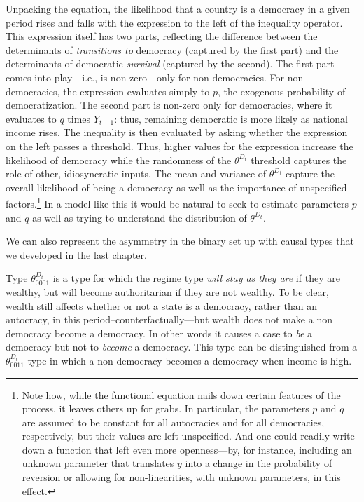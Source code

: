 \documentclass[
  12pt,
]{book}
\begin{document}
Unpacking the equation, the likelihood that a country is a democracy in a given period rises and falls with the expression to the left of the inequality operator. This expression itself has two parts, reflecting the difference between the determinants of \emph{transitions to} democracy (captured by the first part) and the determinants of democratic \emph{survival} (captured by the second). The first part comes into play---i.e., is non-zero---only for non-democracies. For non-democracies, the expression evaluates simply to \(p\), the exogenous probability of democratization. The second part is non-zero only for democracies, where it evaluates to \(q\) times \(Y_{t-1}\): thus, remaining democratic is more likely as national income rises. The inequality is then evaluated by asking whether the expression on the left passes a threshold. Thus, higher values for the expression increase the likelihood of democracy while the randomness of the \(\theta^{D_t}\) threshold captures the role of other, idiosyncratic inputs. The mean and variance of \(\theta^{D_t}\) capture the overall likelihood of being a democracy as well as the importance of unspecified factors.\footnote{Note how, while the functional equation nails down certain features of the process, it leaves others up for grabs. In particular, the parameters \(p\) and \(q\) are assumed to be constant for all autocracies and for all democracies, respectively, but their values are left unspecified. And one could readily write down a function that left even more openness---by, for instance, including an unknown parameter that translates \(y\) into a change in the probability of reversion or allowing for non-linearities, with unknown parameters, in this effect.} In a model like this it would be natural to seek to estimate parameters \(p\) and \(q\) as well as trying to understand the distribution of \(\theta^{D_t}\).

We can also represent the asymmetry in the binary set up with causal types that we developed in the last chapter.

Type \(\theta^{D_t}_{0001}\) is a type for which the regime type \emph{will stay as they are} if they are wealthy, but will become authoritarian if they are not wealthy. To be clear, wealth still affects whether or not a state is a democracy, rather than an autocracy, in this period--counterfactually---but wealth does not make a non democracy become a democracy. In other words it causes a case to \emph{be} a democracy but not to \emph{become} a democracy. This type can be distinguished from a \(\theta^{D_t}_{0011}\) type in which a non democracy becomes a democracy when income is high.
\end{document}
